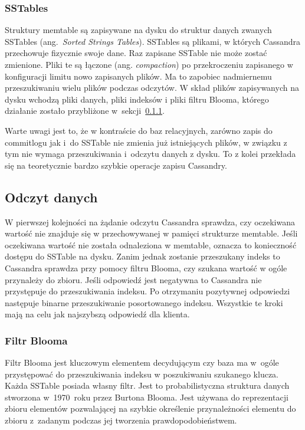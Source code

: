 \subsubsection{SSTables}

Struktury memtable są zapisywane na dysku do struktur danych zwanych SSTables (ang.~\textit{Sorted Strings Tables}).
SSTables są plikami, w których Cassandra przechowuje fizycznie swoje dane.
Raz zapisane SSTable nie może zostać zmienione.
Pliki te są łączone (ang. \textit{compaction}) po przekroczeniu zapisanego w konfiguracji limitu nowo zapisanych plików.
Ma to zapobiec nadmiernemu przeszukiwaniu wielu plików podczas odczytów.
W skład plików zapisywanych na dysku wchodzą pliki danych, pliki indeksów i pliki filtru Blooma, którego działanie zostało przybliżone w~sekcji~\ref{sec:cassandraBloomFilter}.

Warte uwagi jest to, że w kontraście do baz relacyjnych, zarówno zapis do commitlogu jak i~do SSTable nie zmienia już istniejących plików, w związku z tym nie wymaga przeszukiwania i~odczytu danych z dysku.
To z kolei przekłada się na teoretycznie bardzo szybkie operacje zapisu Cassandry.

\subsection{Odczyt danych}

W pierwszej kolejności na żądanie odczytu Cassandra sprawdza, czy oczekiwana wartość nie znajduje się w przechowywanej w pamięci strukturze memtable.
Jeśli oczekiwana wartość nie została odnaleziona w memtable, oznacza to konieczność dostępu do SSTable na dysku.
Zanim jednak zostanie przeszukany indeks to Cassandra sprawdza przy pomocy filtru Blooma, czy szukana wartość w ogóle przynależy do zbioru. 
Jeśli odpowiedź jest negatywna to Cassandra nie przystępuje do przeszukiwania indeksu.
Po otrzymaniu pozytywnej odpowiedzi następuje binarne przeszukiwanie posortowanego indeksu.
Wszystkie te kroki mają na celu jak najszybszą odpowiedź dla klienta.

\subsubsection{Filtr Blooma} \label{sec:cassandraBloomFilter}

Filtr Blooma jest kluczowym elementem decydującym czy baza ma w~ogóle przystępować do przeszukiwania indeksu w poszukiwaniu szukanego klucza.
Każda SSTable posiada własny filtr.
Jest to probabilistyczna struktura danych stworzona w~1970~roku przez Burtona Blooma.
Jest używana do reprezentacji zbioru elementów pozwalającej na szybkie określenie przynależności elementu do zbioru z~zadanym podczas jej tworzenia prawdopodobieństwem.

